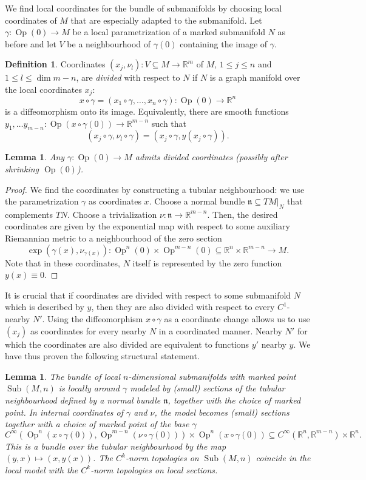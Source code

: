 \documentclass{amsart}
\newcommand{\RR}{\mathbb{R}}
\newcommand{\Sub}{\operatorname{Sub}}
\newcommand{\Op}{\operatorname{Op}}
\newtheorem{lemma}[proposition]{Lemma}
\theoremstyle{definition}
\newtheorem{definition}[proposition]{Definition}
\theoremstyle{remark}
\numberwithin{equation}{section}
\begin{document}
We find local coordinates for the bundle of submanifolds by choosing local coordinates of $M$ that are especially adapted to the submanifold. Let $\gamma:\Op(0)\to M$ be a local parametrization of a marked submanifold $N$ as before and let $V$ be a neighbourhood of $\gamma(0)$ containing the image of $\gamma$. 
\begin{definition}
    Coordinates $(x_j,\nu_l):V\subseteq M\to\RR^m$ of $M$, $1\leq j\leq n$ and $1\leq l\leq \dim m-n$, are \emph{divided} with respect to $N$ if $N$ is a graph manifold over the local coordinates $x_j$: 
    $$x\circ \gamma =(x_1\circ\gamma,\ldots,x_n\circ\gamma):\Op(0)\to \RR^n$$ 
    is a diffeomorphism onto its image. Equivalently, there are smooth functions $y_1,\ldots y_{m-n}:\Op(x\circ\gamma(0))\to \RR^{m-n}$ such that 
    $$(x_j\circ\gamma, \nu_l\circ\gamma)=(x_j\circ\gamma, y(x_j\circ\gamma)).$$
\end{definition}
\begin{lemma}\label{lem:dividedCoords}
    Any $\gamma:\Op(0)\to M$ admits divided coordinates (possibly after shrinking $\Op(0)$). 
\end{lemma}
\begin{proof}
    We find the coordinates by constructing a tubular neighbourhood: we use the parametrization $\gamma$ as coordinates $x$. 
    Choose a normal bundle $\mathfrak n\subseteq TM|_N$ that complements $TN$. Choose a trivialization $\nu:\mathfrak n\to \RR^{m-n}$. Then, the desired coordinates are given by the exponential map with respect to some auxiliary Riemannian metric to a neighbourhood of the zero section
    $$\exp(\gamma(x),\nu_{\gamma(x)}):\Op^n(0)\times \Op^{m-n}(0)\subseteq \RR^n\times\RR^{m-n} \to M.$$
    Note that in these coordinates, $N$ itself is represented by the zero function $y(x)\equiv 0$. 
\end{proof}

It is crucial that if coordinates are divided with respect to some submanifold $N$ which is described by $y$, then they are also divided with respect to every $C^1$-nearby $N'$. Using the diffeomorphism $x\circ\gamma$ as a coordinate change allows us to use $(x_j)$ as coordinates for every nearby $N$ in a coordinated manner. Nearby $N'$ for which the coordinates are also divided are equivalent to functions $y'$ nearby $y$. We have thus proven the following structural statement.

\begin{lemma}
    The bundle of local $n$-dimensional submanifolds with marked point $\Sub(M,n)$ is locally around $\gamma$ modeled by (small) sections of the tubular neighbourhood defined by a normal bundle $\mathfrak n$, together with the choice of marked point. In internal coordinates of $\gamma$ and $\nu$, the model becomes (small) sections together with a choice of marked point of the base $\gamma$ $$C^\infty(\Op^n(x\circ\gamma(0)),\Op^{m-n}(\nu\circ\gamma(0)))\times \Op^n(x\circ\gamma(0))\subseteq C^\infty(\RR^n,\RR^{m-n})\times\RR^n.$$
    This is a bundle over the tubular neighbourhood by the map $(y,x)\mapsto (x, y(x))$.
    The $C^k$-norm topologies on $\Sub(M,n)$ coincide in the local model with the $C^k$-norm topologies on local sections. 
\end{lemma}
\end{document}
